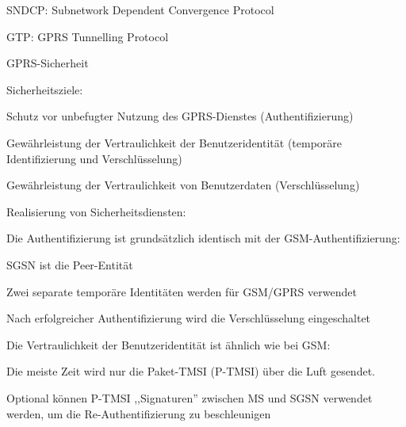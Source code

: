 \documentclass[a4paper]{article}
\begin{document}
\begin{multicols}{3}


      \begin{itemize*}
            \item SNDCP: Subnetwork Dependent Convergence Protocol
            \item GTP: GPRS Tunnelling Protocol
      \end{itemize*}

      GPRS-Sicherheit
      \begin{itemize*}
            \item Sicherheitsziele:
            \begin{itemize*}
                  \item Schutz vor unbefugter Nutzung des GPRS-Dienstes (Authentifizierung)
                  \item Gewährleistung der Vertraulichkeit der Benutzeridentität (temporäre Identifizierung und Verschlüsselung)
                  \item Gewährleistung der Vertraulichkeit von Benutzerdaten (Verschlüsselung)
            \end{itemize*}
            \item Realisierung von Sicherheitsdiensten:
            \begin{itemize*}
                  \item Die Authentifizierung ist grundsätzlich identisch mit der GSM-Authentifizierung:
                  \begin{itemize*}
                        \item SGSN ist die Peer-Entität
                        \item Zwei separate temporäre Identitäten werden für GSM/GPRS verwendet
                        \item Nach erfolgreicher Authentifizierung wird die Verschlüsselung eingeschaltet
                  \end{itemize*}
                  \item Die Vertraulichkeit der Benutzeridentität ist ähnlich wie bei GSM:
                  \begin{itemize*}
                        \item Die meiste Zeit wird nur die Paket-TMSI (P-TMSI) über die Luft gesendet.
                        \item Optional können P-TMSI ,,Signaturen'' zwischen MS und SGSN verwendet werden, um die Re-Authentifizierung zu beschleunigen

\end{itemize*}
\end{itemize*}
\end{itemize*}
\end{multicols}
\end{document}
